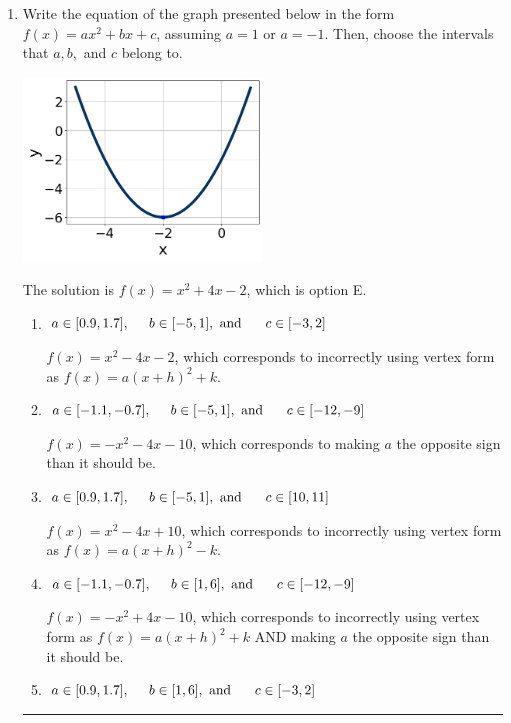 \documentclass{extbook}[14pt]
\newcommand{\litem}[1]{\item #1

\rule{\textwidth}{0.4pt}}
\begin{document}
\begin{enumerate}\litem{
Write the equation of the graph presented below in the form $f(x)=ax^2+bx+c$, assuming  $a=1$ or $a=-1$. Then, choose the intervals that $a, b,$ and $c$ belong to.

\begin{center}
    \includegraphics[width=0.5\textwidth]{../Figures/quadraticGraphToEquationC.png}
\end{center}


The solution is \( f(x) = x^{2} +4 x -2 \), which is option E.\begin{enumerate}[label=\Alph*.]
\item \( a \in [0.9, 1.7], \hspace*{5mm} b \in [-5, 1], \text{ and } \hspace*{5mm} c \in [-3, 2] \)

$f(x)=x^{2} -4 x -2$, which corresponds to incorrectly using vertex form as $f(x) = a(x+h)^2+k$.
\item \( a \in [-1.1, -0.7], \hspace*{5mm} b \in [-5, 1], \text{ and } \hspace*{5mm} c \in [-12, -9] \)

$f(x)=-x^{2} -4 x -10$, which corresponds to making $a$ the opposite sign than it should be.
\item \( a \in [0.9, 1.7], \hspace*{5mm} b \in [-5, 1], \text{ and } \hspace*{5mm} c \in [10, 11] \)

$f(x)=x^{2} -4 x + 10$, which corresponds to incorrectly using vertex form as $f(x) = a(x+h)^2 - k$.
\item \( a \in [-1.1, -0.7], \hspace*{5mm} b \in [1, 6], \text{ and } \hspace*{5mm} c \in [-12, -9] \)

$f(x)=-x^{2} +4 x -10$, which corresponds to incorrectly using vertex form as $f(x) = a(x+h)^2+k$ AND making $a$ the opposite sign than it should be.
\item \( a \in [0.9, 1.7], \hspace*{5mm} b \in [1, 6], \text{ and } \hspace*{5mm} c \in [-3, 2] \)


\end{enumerate}}
\end{enumerate}
\end{document}
